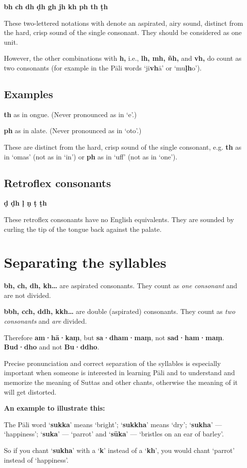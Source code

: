 \textbf{bh ch dh ḍh gh jh kh ph th ṭh}

These two-lettered notations with  denote an aspirated, airy sound,
distinct from the hard, crisp sound of the single consonant. They should be
considered as one unit.

However, the other combinations with \textbf{h,} i.e., \textbf{lh, mh, ñh,} and
\textbf{vh,} do count as two consonants (for example in the Pāli words
‘ji\textbf{vh}ā’ or ‘mu\textbf{ḷh}o’).

\clearpage

\subsection{Examples}

\textbf{th} as  in ongue. (Never pronounced as in `e'.)

\textbf{ph} as  in alate. (Never pronounced as in `oto'.)

These are distinct from the hard, crisp sound of the single consonant, e.g.
\textbf{th} as in `omas' (not as in `in') or \textbf{ph} as
in `uff' (not as in `one').

\subsection{Retroflex consonants}

\textbf{ḍ ḍh ḷ ṇ ṭ ṭh}

These retroflex consonants have no English equivalents. They are sounded
by curling the tip of the tongue back against the palate.

\section{Separating the syllables}

\textbf{bh, ch, dh, kh\ldots} are aspirated consonants. They count as
\textit{one consonant} and are not divided.

\textbf{bbh, cch, ddh, kkh\ldots} are double (aspirated) consonants. They count as
\textit{two consonants} and \textit{are} divided.

Therefore \textbf{am·hā·kaṃ}, but \textbf{sa·dham·maṃ}, not \textbf{sad·ham·maṃ}.
\textbf{Bud·dho} and not \textbf{Bu·ddho}.

Precise pronunciation and correct separation of the syllables is
especially important when someone is interested in learning Pāli and to
understand and memorize the meaning of Suttas and other chants,
otherwise the meaning of it will get distorted.

\textbf{An example to illustrate this:}

The Pāli word ‘\textbf{sukka}’ means ‘bright’; ‘\textbf{sukkha}’ means
‘dry’; ‘\textbf{sukha}’ --- ‘happiness’; ‘\textbf{suka}’ --- ‘parrot’ and
‘\textbf{sūka}’ --- ‘bristles on an ear of barley’.

So if you chant ‘\textbf{sukha}’ with a ‘\textbf{k}’ instead of a
‘\textbf{kh}’, you would chant ‘parrot’ instead of ‘happiness’.

